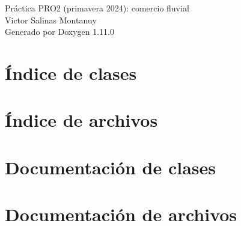 \documentclass[twoside]{book}
\newcommand{\+}{\discretionary{\mbox{\scriptsize$\hookleftarrow$}}{}{}}
\newcommand{\clearemptydoublepage}{%
    \newpage{\pagestyle{empty}\cleardoublepage}%
  }
\begin{document}
  \raggedbottom
    \hypersetup{pageanchor=false,
                bookmarksnumbered=true,
                pdfencoding=unicode
               }
  \begin{titlepage}
  \vspace*{7cm}
  \begin{center}%
  {\Large Práctica PRO2 (primavera 2024)\+: comercio fluvial}\\
  [1ex]\large Victor Salinas Montanuy \\
  \vspace*{1cm}
  {\large Generado por Doxygen 1.11.0}\\
  \end{center}
  \end{titlepage}
  \clearemptydoublepage
  \tableofcontents
  \clearemptydoublepage
  \hypersetup{pageanchor=true}
\chapter{Índice de clases}

\chapter{Índice de archivos}

\chapter{Documentación de clases}




\chapter{Documentación de archivos}


















  \backmatter
  \newpage
  \clearemptydoublepage
  \printindex
\end{document}
